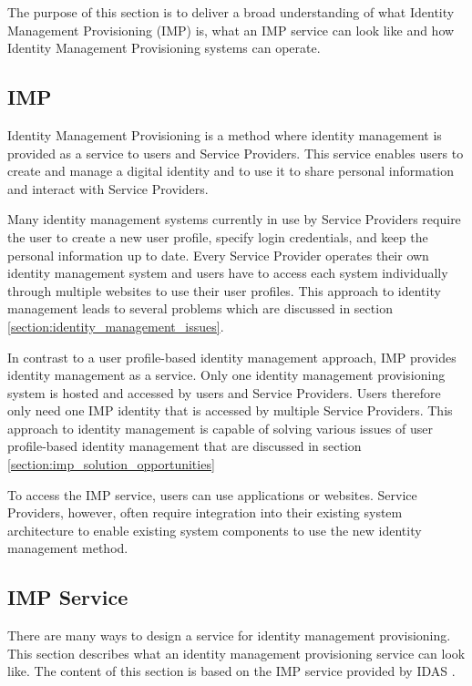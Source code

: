 The purpose of this section is to deliver a broad understanding of what Identity Management Provisioning (IMP) is, what an IMP service can look like and how Identity Management Provisioning systems can operate.

\subsection{IMP}
Identity Management Provisioning is a method where identity management is provided as a service to users and Service Providers. This service enables users to create and manage a digital identity and to use it to share personal information and interact with Service Providers.

Many identity management systems currently in use by Service Providers require the user to create a new user profile, specify login credentials, and keep the personal information up to date. Every Service Provider operates their own identity management system and users have to access each system individually through multiple websites to use their user profiles. This approach to identity management leads to several problems which are discussed in section \ref{section:identity_management_issues}.

In contrast to a user profile-based identity management approach, IMP provides identity management as a service. Only one identity management provisioning system is hosted and accessed by users and Service Providers. Users therefore only need one IMP identity that is accessed by multiple Service Providers. This approach to identity management is capable of solving various issues of user profile-based identity management that are discussed in section \ref{section:imp_solution_opportunities}

To access the IMP service, users can use applications or websites. Service Providers, however, often require integration into their existing system architecture to enable existing system components to use the new identity management method.

\subsection{IMP Service}

There are many ways to design a service for identity management provisioning. This section describes what an identity management provisioning service can look like. The content of this section is based on the IMP service provided by IDAS \cite{idas}.

